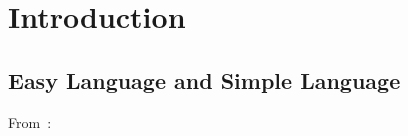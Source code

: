 \chapter{Introduction}\label{ch:introduction}


\section{Easy Language and Simple Language}\label{sec:el}


From~\autocite{easyLanguageBook}:





